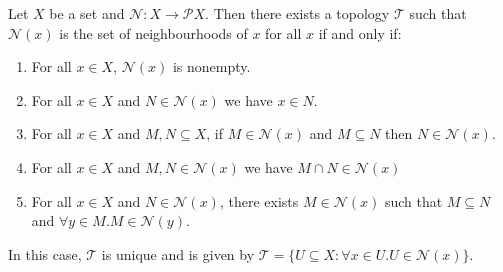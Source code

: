 \begin{prop}
  \label{prop:neighbourhood}
  Let $X$ be a set and $\mathcal{N} : X \rightarrow \mathcal{P} X$. Then there exists a topology $\mathcal{T}$ such that $\mathcal{N}(x)$ is the set of neighbourhoods of $x$ for all $x$ if and only if:
  \begin{enumerate}
    \item
    For all $x \in X$, $\mathcal{N}(x)$ is nonempty.
    \item
    For all $x \in X$ and $N \in \mathcal{N}(x)$ we have $x \in N$.
    \item
    For all $x \in X$ and $M, N \subseteq X$, if $M \in \mathcal{N}(x)$ and $M \subseteq N$ then $N \in \mathcal{N}(x)$.
    \item
    For all $x \in X$ and $M, N \in \mathcal{N}(x)$ we have $M \cap N \in \mathcal{N}(x)$
    \item
    For all $x \in X$ and $N \in \mathcal{N}(x)$, there exists $M \in \mathcal{N}(x)$ such that $M \subseteq N$ and $\forall y \in M. M \in \mathcal{N}(y)$.
  \end{enumerate}
  In this case, $\mathcal{T}$ is unique and is given by $\mathcal{T} = \{ U \subseteq X : \forall x \in U. U \in \mathcal{N}(x) \}$.
\end{prop}


